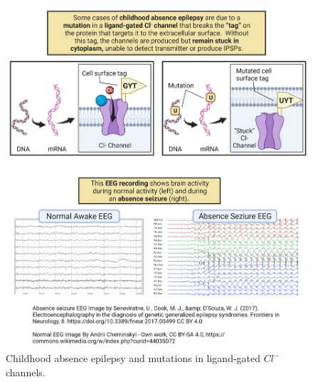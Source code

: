 \documentclass[
]{book}
\begin{document}
\begin{figure}

{\centering \includegraphics[width=0.9\linewidth]{images/ch02/02_29} 

}

\caption{Childhood absence epilepsy and mutations in ligand-gated $Cl^{-}$ channels.}\label{fig:absence-epilepsy}
\end{figure}
\end{document}
